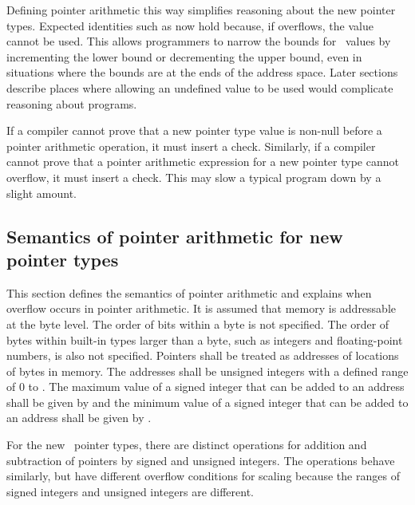 Defining pointer arithmetic this way simplifies reasoning about the new
pointer types. Expected identities such as  now hold
because, if  overflows, the value cannot be
used. This allows programmers to narrow the bounds for
\arrayptr\ values by incrementing the lower bound or
decrementing the upper bound, even in situations where the bounds are at
the ends of the address space. Later sections describe places where
allowing an undefined value to be used would complicate reasoning about
programs.

If a compiler cannot prove that a new pointer type value is non-null
before a pointer arithmetic operation, it must insert a check.
Similarly, if a compiler cannot prove that a pointer arithmetic
expression for a new pointer type cannot overflow, it must insert a
check. This may slow a typical program down by a slight amount.

\subsection{Semantics of pointer arithmetic for new pointer types}
\label{section:new-pointer-types-semantics}

This section defines the semantics of pointer arithmetic and explains
when overflow occurs in pointer arithmetic. It is assumed that memory is
addressable at the byte level. The order of bits within a byte is not
specified. The order of bytes within built-in types larger than a byte,
such as integers and floating-point numbers, is also not specified.
Pointers shall be treated as addresses of locations of bytes in memory.
The addresses shall be unsigned integers with a defined range of 0 to
. The maximum value of a signed integer that can be
added to an address shall be given by  and the
minimum value of a signed integer that can be added to an address shall
be given by .

For the new
\arrayptrT\ pointer
types, there are distinct operations for addition and subtraction of
pointers by signed and unsigned integers. The operations behave
similarly, but have different overflow conditions for scaling because
the ranges of signed integers and unsigned integers are different.

